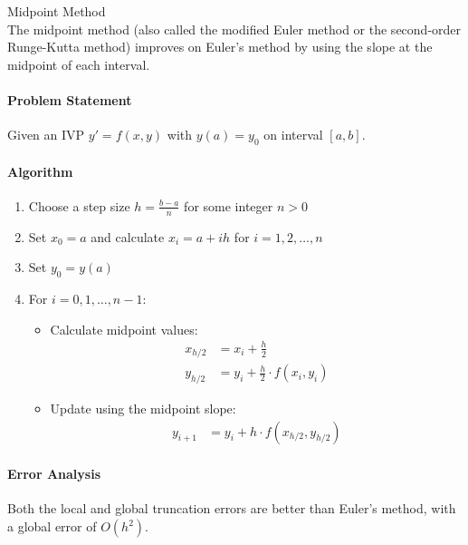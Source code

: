 \begin{KR}{Midpoint Method}\\
The midpoint method (also called the modified Euler method or the second-order Runge-Kutta method) improves on Euler's method by using the slope at the midpoint of each interval.

\paragraph{Problem Statement}
Given an IVP $y' = f(x,y)$ with $y(a) = y_0$ on interval $[a,b]$.

\paragraph{Algorithm}
\begin{enumerate}
    \item Choose a step size $h = \frac{b-a}{n}$ for some integer $n > 0$
    \item Set $x_0 = a$ and calculate $x_i = a + ih$ for $i = 1, 2, \ldots, n$
    \item Set $y_0 = y(a)$
    \item For $i = 0, 1, \ldots, n-1$:
    \begin{itemize}
        \item Calculate midpoint values:
        \begin{align*}
        x_{h/2} &= x_i + \frac{h}{2}\\
        y_{h/2} &= y_i + \frac{h}{2} \cdot f(x_i, y_i)
        \end{align*}
        \item Update using the midpoint slope:
        \begin{align*}
        y_{i+1} &= y_i + h \cdot f(x_{h/2}, y_{h/2})
        \end{align*}
    \end{itemize}
\end{enumerate}

\paragraph{Error Analysis}
Both the local and global truncation errors are better than Euler's method, with a global error of $O(h^2)$.
\end{KR}


